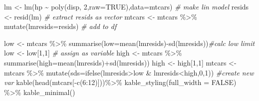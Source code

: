 \documentclass[
]{article}
\newenvironment{Shaded}{\begin{snugshade}}{\end{snugshade}}
\newcommand{\AttributeTok}[1]{\textcolor[rgb]{0.77,0.63,0.00}{#1}}
\newcommand{\CommentTok}[1]{\textcolor[rgb]{0.56,0.35,0.01}{\textit{#1}}}
\newcommand{\ConstantTok}[1]{\textcolor[rgb]{0.00,0.00,0.00}{#1}}
\newcommand{\DecValTok}[1]{\textcolor[rgb]{0.00,0.00,0.81}{#1}}
\newcommand{\FunctionTok}[1]{\textcolor[rgb]{0.00,0.00,0.00}{#1}}
\newcommand{\NormalTok}[1]{#1}
\newcommand{\OtherTok}[1]{\textcolor[rgb]{0.56,0.35,0.01}{#1}}
\newcommand{\SpecialCharTok}[1]{\textcolor[rgb]{0.00,0.00,0.00}{#1}}
\begin{document}
\begin{Shaded}
\begin{Highlighting}[]
\NormalTok{lm }\OtherTok{\textless{}{-}} \FunctionTok{lm}\NormalTok{(hp }\SpecialCharTok{\textasciitilde{}} \FunctionTok{poly}\NormalTok{(disp, }\DecValTok{2}\NormalTok{,}\AttributeTok{raw=}\ConstantTok{TRUE}\NormalTok{),}\AttributeTok{data=}\NormalTok{mtcars) }\CommentTok{\# make lin model}
\NormalTok{resids }\OtherTok{\textless{}{-}} \FunctionTok{resid}\NormalTok{(lm) }\CommentTok{\# extract resids as vector}
\NormalTok{mtcars }\OtherTok{\textless{}{-}}\NormalTok{ mtcars }\SpecialCharTok{\%\textgreater{}\%} \FunctionTok{mutate}\NormalTok{(}\AttributeTok{lmresids=}\NormalTok{resids) }\CommentTok{\# add to df}


\NormalTok{low }\OtherTok{\textless{}{-}}\NormalTok{ mtcars }\SpecialCharTok{\%\textgreater{}\%} \FunctionTok{summarise}\NormalTok{(}\AttributeTok{low=}\FunctionTok{mean}\NormalTok{(lmresids)}\SpecialCharTok{{-}}\FunctionTok{sd}\NormalTok{(lmresids))}\CommentTok{\#calc low limit}
\NormalTok{low }\OtherTok{\textless{}{-}}\NormalTok{ low[}\DecValTok{1}\NormalTok{,}\DecValTok{1}\NormalTok{] }\CommentTok{\# assign as variable}
\NormalTok{high }\OtherTok{\textless{}{-}}\NormalTok{ mtcars }\SpecialCharTok{\%\textgreater{}\%} \FunctionTok{summarise}\NormalTok{(}\AttributeTok{high=}\FunctionTok{mean}\NormalTok{(lmresids)}\SpecialCharTok{+}\FunctionTok{sd}\NormalTok{(lmresids))}
\NormalTok{high }\OtherTok{\textless{}{-}}\NormalTok{ high[}\DecValTok{1}\NormalTok{,}\DecValTok{1}\NormalTok{]                   }
\NormalTok{mtcars }\OtherTok{\textless{}{-}}\NormalTok{ mtcars }\SpecialCharTok{\%\textgreater{}\%} \FunctionTok{mutate}\NormalTok{(}\AttributeTok{sds=}\FunctionTok{ifelse}\NormalTok{(lmresids}\SpecialCharTok{\textgreater{}}\NormalTok{low }\SpecialCharTok{\&}\NormalTok{ lmresids}\SpecialCharTok{\textless{}}\NormalTok{high,}\DecValTok{0}\NormalTok{,}\DecValTok{1}\NormalTok{)) }\CommentTok{\#create new var}
\FunctionTok{kable}\NormalTok{(}\FunctionTok{head}\NormalTok{(mtcars[}\SpecialCharTok{{-}}\FunctionTok{c}\NormalTok{(}\DecValTok{6}\SpecialCharTok{:}\DecValTok{12}\NormalTok{)]))}\SpecialCharTok{\%\textgreater{}\%} 
  \FunctionTok{kable\_styling}\NormalTok{(}\AttributeTok{full\_width =} \ConstantTok{FALSE}\NormalTok{) }\SpecialCharTok{\%\textgreater{}\%} \FunctionTok{kable\_minimal}\NormalTok{()}
\end{Highlighting}
\end{Shaded}
\end{document}

